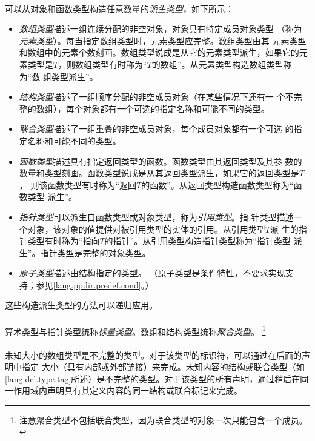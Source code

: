 \paragraph{}
可以从对象和函数类型构造任意数量的\textit{派生类型}，如下所示：
\begin{itemize}
  \item{\textit{数组类型}描述一组连续分配的非空对象，对象具有特定成员对象类型
    （称为\textit{元素类型}）。每当指定数组类型时，元素类型应完整。数组类型由其
    元素类型和数组中的元素个数刻画。数组类型说成是从它的元素类型派生，如果它的元
    素类型是$T$，则数组类型有时称为``$T$的数组''。从元素类型构造数组类型称为``数
    组类型派生''。}
  \item{\textit{结构类型}描述了一组顺序分配的非空成员对象（在某些情况下还有一
    个不完整的数组），每个对象都有一个可选的指定名称和可能不同的类型。}
  \item{\textit{联合类型}描述了一组重叠的非空成员对象，每个成员对象都有一个可选
    的指定名称和可能不同的类型。}
  \item{\textit{函数类型}描述具有指定返回类型的函数。函数类型由其返回类型及其参
    数的数量和类型刻画。函数类型说成是从其返回类型派生，如果它的返回类型是$T$，
    则该函数类型有时称为``返回$T$的函数''。从返回类型构造函数类型称为``函数类型
    派生''。}
  \item{\textit{指针类型}可以派生自函数类型或对象类型，称为\textit{引用类型}。指
    针类型描述一个对象，该对象的值提供对被引用类型的实体的引用。从引用类型$T$派
    生的指针类型有时称为``指向$T$的指针''。从引用类型构造指针类型称为``指针类型
    派生''。指针类型是完整的对象类型。}
  \item{\textit{原子类型}描述由结构指定的类型。
    （原子类型是条件特性，不要求实现支持；参见\ref{lang.ppdir.predef.cond}。）}
\end{itemize}
这些构造派生类型的方法可以递归应用。

\paragraph{}
算术类型与指针类型统称\textit{标量类型}。数组和结构类型统称\textit{聚合类型}。
\footnote{注意聚合类型不包括联合类型，因为联合类型的对象一次只能包含一个成员。}

\paragraph{}
未知大小的数组类型是不完整的类型。对于该类型的标识符，可以通过在后面的声明中指定
大小（具有内部或外部链接）来完成。未知内容的结构或联合类型（如
\ref{lang.dcl.type.tag}所述）是不完整的类型。对于该类型的所有声明，通过稍后在同
一作用域内声明具有其定义内容的同一结构或联合标记来完成。

